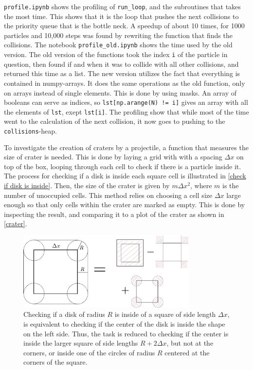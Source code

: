 \documentclass{article}
\begin{document}
    \verb|profile.ipynb| shows the profiling of \verb|run_loop|, and the subroutines that takes the most time. This shows that it is the loop that pushes the next collisions to the priority queue that is the bottle neck. A speedup of about 10 times, for 1000 particles and 10,000 steps was found by rewriting the function that finds the collisions. The notebook \verb|profile_old.ipynb| shows the time used by the old version. The old version of the functions took the index \verb|i| of the particle in question, then found if and when it was to collide with all other collisions, and returned this time as a list. The new version utilizes the fact that everything is contained in numpy-arrays. It does the same operations as the old function, only on arrays instead of single elements. This is done by using masks. An array of booleans can serve as indices, so \verb|lst[np.arange(N) != i]| gives an array with all the elements of \verb|lst|, exept \verb|lst[i]|. The profiling show that while most of the time went to the calculation of the next collision, it now goes to pushing to the \verb|collisions|-heap.

    To investigate the creation of craters by a projectile, a function that measures the size of crater is needed. This is done by laying a grid with with a spacing $\Delta x$ on top of the box, looping through each cell to check if there is a particle inside it. The process for checking if a disk is inside each square cell is illustrated in \autoref{check if disk is inside}. Then, the size of the crater is given by $m \Delta x^2$, where $m$ is the number of unoccupied cells. This method relies on choosing a cell size $\Delta x$ large enough so that only cells within the crater are marked as empty. This is done by inspecting the result, and comparing it to a plot of the crater as shown in \autoref{crater}.


    \begin{figure}[H]
        \centering
        \includegraphics[width=0.8\textwidth]{figure.pdf}
        \caption{Checking if a disk of radius $R$ is inside of a square of side length $\Delta x$, is equivalent to checking if the center of the disk is inside the shape on the left side. Thus, the task is reduced to checking if the center is inside the larger square of side lengths $R + 2 \Delta x$, but not at the corners, or inside one of the circles of radius $R$ centered at the corners of the square.}
        \label{check if disk is inside}
    \end{figure}
\end{document}
